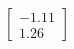 \documentclass[preview]{standalone}
\begin{document}
\begin{align*}
\begin{bmatrix} -1.11 \\ 1.26 \end{bmatrix}
\end{align*}
\end{document}

